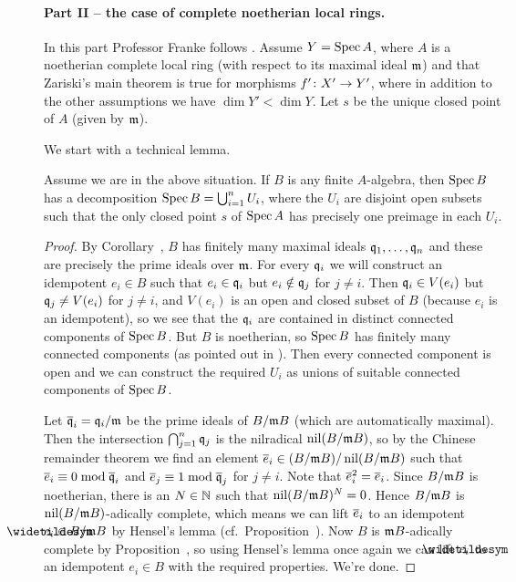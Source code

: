 \documentclass[a4paper,parskip=half,numbers=enddot, DIV=12]{scrreprt}
\begin{document}
\paragraph{Part II -- the case of complete noetherian local rings.} In this part Professor Franke follows \cite[Exposé~VIII.6]{sga1}. Assume $Y=\operatorname{Spec} A$, where $A$ is a noetherian complete local ring (with respect to its maximal ideal $\mathfrak{m}$) and that Zariski's main theorem is true for morphisms $f'\colon X'\morphism Y'$, where in addition to the other assumptions we have $\dim Y'<\dim Y$. Let $s$ be the unique closed point of $A$ (given by $\mathfrak{m}$).

We start with a technical lemma.
\begin{lem}
	Assume we are in the above situation. If $B$ is any finite $A$-algebra, then $\operatorname{Spec} B$ has a decomposition $\operatorname{Spec} B=\bigcup_{i=1}^nU_i$, where the $U_i$ are disjoint open subsets such that the only closed point $s$ of $\operatorname{Spec} A$ has precisely one preimage in each $U_i$.
\end{lem}
\begin{proof}
	By Corollary~, $B$ has finitely many maximal ideals $\mathfrak{q}_1,\ldots,\mathfrak{q}_n$ and these are precisely the prime ideals over $\mathfrak{m}$. For every $\mathfrak{q}_i$ we will construct an idempotent $e_i\in B$ such that $e_i\in \mathfrak{q}_i$ but $e_i\notin\mathfrak{q}_j$ for $j\neq i$. Then $\mathfrak{q}_i\in V(e_i)$ but $\mathfrak{q}_j\neq V(e_i)$ for $j\neq i$, and $V(e_i)$ is an open and closed subset of $B$ (because $e_i$ is an idempotent), so we see that the $\mathfrak{q}_i$ are contained in distinct connected components of $\operatorname{Spec} B$. But $B$ is noetherian, so $\operatorname{Spec} B$ has finitely many connected components (as pointed out in \cite[Lemma~2.4.2]{alggeo1}). Then every connected component is open and we can construct the required $U_i$ as unions of suitable connected components of $\operatorname{Spec} B$.
	
	Let $\overline{\mathfrak{q}}_i=\mathfrak{q}_i/\mathfrak{m}$ be the prime ideals of $B/\mathfrak{m} B$ (which are automatically maximal). Then the intersection $\bigcap_{j=1}^n\mathfrak{q}_j$ is the nilradical $\operatorname{nil}(B/\mathfrak{m} B)$, so by the Chinese remainder theorem we find an element $\overline{e}_i\in (B/\mathfrak{m} B)/\operatorname{nil}(B/\mathfrak{m} B)$ such that $\overline{e}_i\equiv 0\bmod \overline{\mathfrak{q}}_i$ and $\overline{e}_j\equiv 1\bmod\overline{\mathfrak{q}}_j$ for $j\neq i$. Note that $\overline{e}_i^2=\overline{e}_i$. Since $B/\mathfrak{m} B$ is noetherian, there is an $N\in\mathbb{N}$ such that $\operatorname{nil}(B/\mathfrak{m} B)^N=0$. Hence $B/\mathfrak{m} B$ is $\operatorname{nil}(B/\mathfrak{m} B)$-adically complete, which means we can lift $\overline{e}_i$ to an idempotent $\snake{e}_i\in B/\mm B$ by Hensel's lemma (cf.\ Proposition~). Now $B$ is $\mathfrak{m} B$-adically complete by Proposition~, so using Hensel's lemma once again we can lift $\snake{e}_i$ to an idempotent $e_i\in B$ with the required properties. We're done.
\end{proof}
\end{document}
